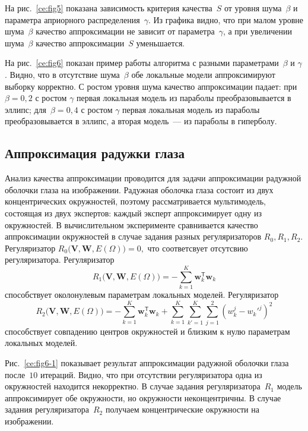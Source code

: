\documentclass[12pt]{a&t}
\begin{document}
На рис.~\ref{ce:fig5} показана зависимость критерия качества~$S$ от уровня шума~$\beta$ и параметра априорного распределения~$\gamma$. Из графика видно, что при малом уровне шума~$\beta$ качество аппроксимации не зависит от параметра~$\gamma$, а при увеличении шума~$\beta$ качество аппроксимации~$ S$ уменьшается.

На рис.~\ref{ce:fig6} показан пример работы алгоритма с разными параметрами~$\beta$ и $\gamma$. Видно, что в отсутствие шума~$\beta$ обе локальные модели аппроксимируют выборку корректно. С ростом уровня шума качество аппроксимации падает: при~$\beta = 0 {,}2$ с ростом $\gamma$ первая локальная модель из параболы преобразовывается в эллипс; для~$\beta=0 {,}4$ с ростом $\gamma$ первая локальная модель из параболы преобразовывается в эллипс, а вторая модель~--- из параболы в гиперболу.

\subsection{Аппроксимация радужки глаза}
Анализ качества аппроксимации проводится для задачи аппроксимации радужной оболочки глаза на изображении. Радужная оболочка глаза состоит из двух концентрических окружностей, поэтому рассматривается мультимодель, состоящая из двух экспертов: каждый эксперт аппроксимирует одну из окружностей. В вычислительном эксперименте сравнивается качество аппроксимации окружностей в случае задания разных регуляризаторов $R_0, R_1, R_2$. Регуляризатор $R_0\bigl(\mathbf{V}, \mathbf{W}, E(\Omega)\bigr)=0,$ что соответсвует отсутсвию регуляризатора. Регуляризатор
\[
R_1\bigl(\mathbf{V}, \mathbf{W}, E(\Omega)\bigr)= -\sum_{k=1}^{K}\mathbf{w}_k^{\mathsf{T}}\mathbf{w}_k
\]
способствует околонулевым параметрам локальных моделей.
Регуляризатор
\[
R_2\bigl(\mathbf{V}, \mathbf{W}, E(\Omega)\bigr)= -\sum_{k=1}^{K}\mathbf{w}_k^{\mathsf{T}}\mathbf{w}_k + \sum_{k=1}^{K}\sum_{k'=1}^{K}\sum_{j=1}^2\left(w_k^j-w_k'^j\right)^2
\]
способствует совпадению центров окружностей и близким к нулю параметрам локальных моделей.

Рис.~\ref{ce:fig6-1} показывает результат аппроксимации радужной оболочки глаза после~$10$ итераций. Видно, что при отсутствии регуляризатора одна из окружностей находится некорректно. В случае задания регуляризатора~$R_1$ модель аппроксимирует обе окружности, но окружности неконцентричны. В случае задания регуляризатора~$R_2$ получаем концентрические окружности на изображении.
\end{document}
